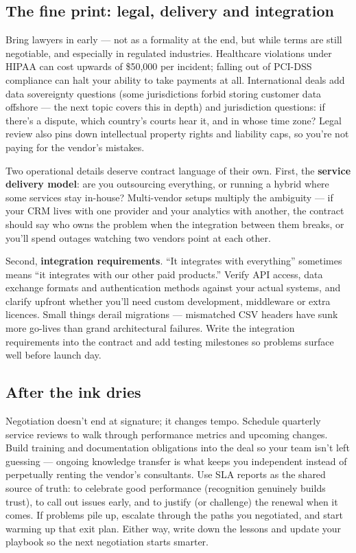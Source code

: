 \subsection{The fine print: legal, delivery and integration}


Bring lawyers in early — not as a formality at the end, but while terms are still negotiable, and especially in regulated industries. Healthcare violations under HIPAA can cost upwards of \$50,000 per incident; falling out of PCI-DSS compliance can halt your ability to take payments at all. International deals add data sovereignty questions (some jurisdictions forbid storing customer data offshore — the next topic covers this in depth) and jurisdiction questions: if there's a dispute, which country's courts hear it, and in whose time zone? Legal review also pins down intellectual property rights and liability caps, so you're not paying for the vendor's mistakes.


Two operational details deserve contract language of their own. First, the \textbf{service delivery model}: are you outsourcing everything, or running a hybrid where some services stay in-house? Multi-vendor setups multiply the ambiguity — if your CRM lives with one provider and your analytics with another, the contract should say who owns the problem when the integration between them breaks, or you'll spend outages watching two vendors point at each other.


Second, \textbf{integration requirements}. ``It integrates with everything'' sometimes means ``it integrates with our other paid products.'' Verify API access, data exchange formats and authentication methods against your actual systems, and clarify upfront whether you'll need custom development, middleware or extra licences. Small things derail migrations — mismatched CSV headers have sunk more go-lives than grand architectural failures. Write the integration requirements into the contract and add testing milestones so problems surface well before launch day.



\subsection{After the ink dries}


Negotiation doesn't end at signature; it changes tempo. Schedule quarterly service reviews to walk through performance metrics and upcoming changes. Build training and documentation obligations into the deal so your team isn't left guessing — ongoing knowledge transfer is what keeps you independent instead of perpetually renting the vendor's consultants. Use SLA reports as the shared source of truth: to celebrate good performance (recognition genuinely builds trust), to call out issues early, and to justify (or challenge) the renewal when it comes. If problems pile up, escalate through the paths you negotiated, and start warming up that exit plan. Either way, write down the lessons and update your playbook so the next negotiation starts smarter.




